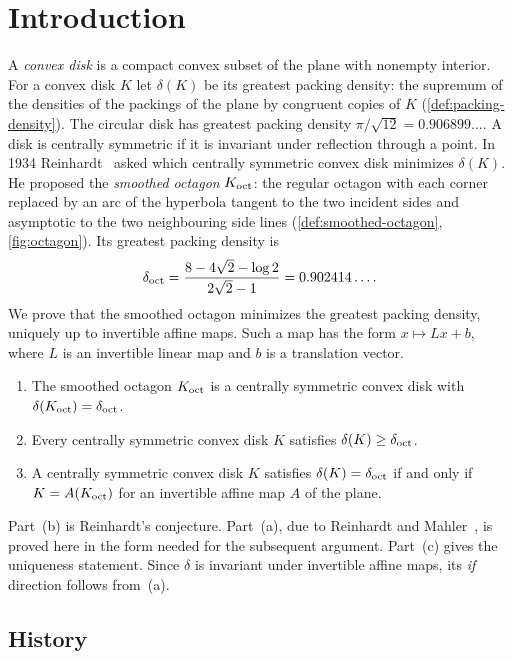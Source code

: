 \section{Introduction}\label{sec:intro}

A \emph{convex disk} is a compact convex subset of the plane with nonempty interior. For a convex
disk $K$ let $\delta(K)$ be its greatest packing density: the supremum of the densities of the
packings of the plane by congruent copies of $K$ (\cref{def:packing-density}). The circular disk
has greatest packing density $\pi/\sqrt{12}=0.906899\ldots$. A disk is centrally symmetric if
it is invariant under reflection through a point. In 1934 Reinhardt~\cite{Reinhardt1934} asked
which centrally symmetric convex disk minimizes $\delta(K)$. He proposed the \emph{smoothed octagon} $K_{\mathrm{oct}}$: the regular octagon with each corner replaced by an
arc of the hyperbola tangent to the two incident sides and asymptotic to the two
neighbouring side lines (\cref{def:smoothed-octagon}, \cref{fig:octagon}). Its greatest packing
density is
\[
  \delta_{\mathrm{oct}}=\frac{8-4\sqrt2-\log2}{2\sqrt2-1}=0.902414\ldots .
\]
We prove that the smoothed octagon minimizes the greatest packing density, uniquely up to
invertible affine maps. Such a map has the form $x\mapsto Lx+b$, where $L$ is an invertible
linear map and $b$ is a translation vector.

\begin{theorem}\label{thm:main}
\begin{enumerate}[label=\textup{(\alph*)}]
\item The smoothed octagon $K_{\mathrm{oct}}$ is a centrally symmetric convex disk with $\delta(K_{\mathrm{oct}})=\delta_{\mathrm{oct}}$.
\item Every centrally symmetric convex disk $K$ satisfies $\delta(K)\ge\delta_{\mathrm{oct}}$.
\item A centrally symmetric convex disk $K$ satisfies $\delta(K)=\delta_{\mathrm{oct}}$ if and only if
  $K=A(K_{\mathrm{oct}})$ for an invertible affine map $A$ of the plane.
\end{enumerate}
\end{theorem}

Part~(b) is Reinhardt's conjecture. Part~(a), due to Reinhardt and
Mahler~\cite{Reinhardt1934,Mahler1947c}, is proved here in the form needed for the subsequent
argument. Part~(c) gives the uniqueness statement. Since $\delta$ is invariant under invertible
affine maps, its \emph{if} direction follows from~(a).

\subsection{History}\label{sec:intro-history}

